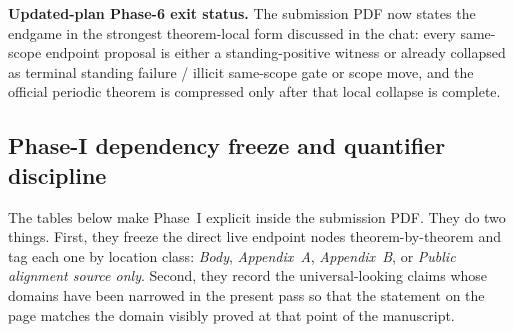 \noindent\textbf{Updated-plan Phase-6 exit status.} The submission PDF now states the endgame in the strongest theorem-local form discussed in the chat: every same-scope endpoint proposal is either a standing-positive witness or already collapsed as terminal standing failure / illicit same-scope gate or scope move, and the official periodic theorem is compressed only after that local collapse is complete.

\subsection*{Phase-I dependency freeze and quantifier discipline}
The tables below make Phase~I explicit inside the submission PDF. They do two things. First, they freeze the direct live endpoint nodes theorem-by-theorem and tag each one by location class: \emph{Body}, \emph{Appendix~A}, \emph{Appendix~B}, or \emph{Public alignment source only}. Second, they record the universal-looking claims whose domains have been narrowed in the present pass so that the statement on the page matches the domain visibly proved at that point of the manuscript.

